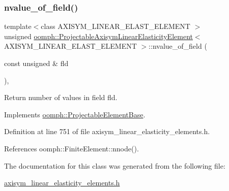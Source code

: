 \subsubsection{\texorpdfstring{nvalue\+\_\+of\+\_\+field()}{nvalue\_of\_field()}}
{\footnotesize\ttfamily template$<$class A\+X\+I\+S\+Y\+M\+\_\+\+L\+I\+N\+E\+A\+R\+\_\+\+E\+L\+A\+S\+T\+\_\+\+E\+L\+E\+M\+E\+NT $>$ \\
unsigned \hyperlink{classoomph_1_1ProjectableAxisymLinearElasticityElement}{oomph\+::\+Projectable\+Axisym\+Linear\+Elasticity\+Element}$<$ A\+X\+I\+S\+Y\+M\+\_\+\+L\+I\+N\+E\+A\+R\+\_\+\+E\+L\+A\+S\+T\+\_\+\+E\+L\+E\+M\+E\+NT $>$\+::nvalue\+\_\+of\+\_\+field (\begin{DoxyParamCaption}\item[{const unsigned \&}]{fld }\end{DoxyParamCaption})\hspace{0.3cm}{\ttfamily [inline]}, {\ttfamily [virtual]}}



Return number of values in field fld. 



Implements \hyperlink{classoomph_1_1ProjectableElementBase_a1a9a6de16f3511bca8e8be770abb9c2e}{oomph\+::\+Projectable\+Element\+Base}.



Definition at line 751 of file axisym\+\_\+linear\+\_\+elasticity\+\_\+elements.\+h.



References oomph\+::\+Finite\+Element\+::nnode().



The documentation for this class was generated from the following file\+:\begin{DoxyCompactItemize}
\item 
\hyperlink{axisym__linear__elasticity__elements_8h}{axisym\+\_\+linear\+\_\+elasticity\+\_\+elements.\+h}\end{DoxyCompactItemize}
